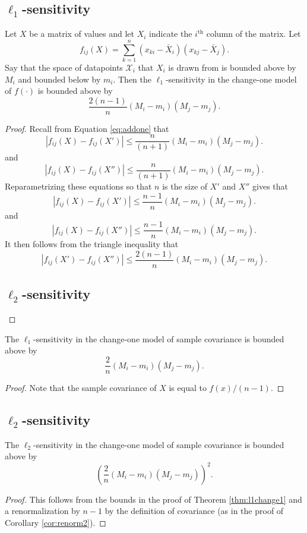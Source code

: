 \documentclass[11pt]{scrartcl} %
\begin{document}
\subsection{$\ell_1$-sensitivity}

\begin{theorem}
\label{thm:l1change1}
Let $X$ be a matrix of values and let $X_i$ indicate the $i^{\text{th}}$ column of the matrix. Let
$$ f_{ij} (X)= \sum_{k=1}^n (x_{ki} - \bar{X}_i)(x_{kj} - \bar{X}_j).$$
Say that the space of datapoints $\mathcal{X}_i$ that $X_i$ is drawn from is bounded above by $M_i$ and bounded below by $m_i$. Then the $\ell_1$-sensitivity in the change-one model of $f(\cdot)$ is bounded above by
$$ \frac{2(n-1)}{n}  (M_i - m_i)(M_j - m_j).$$
\end{theorem}

\begin{proof}
Recall from Equation \ref{eq:addone} that 
$$ \left\vert f_{ij}(X) - f_{ij}(X') \right\vert \le \frac{n}{(n+1)}  (M_i - m_i)(M_j - m_j).$$
and
$$ \left\vert f_{ij}(X) - f_{ij}(X'') \right\vert \le \frac{n}{(n+1)}  (M_i - m_i)(M_j - m_j).$$
Reparametrizing these equations so that $n$ is the size of $X'$ and $X''$ gives that 
$$ \left\vert f_{ij}(X) - f_{ij}(X') \right\vert \le \frac{n-1}{n}  (M_i - m_i)(M_j - m_j).$$
and
$$ \left\vert f_{ij}(X) - f_{ij}(X'') \right\vert \le \frac{n-1}{n}  (M_i - m_i)(M_j - m_j).$$
It then follows from the triangle inequality that 
$$ \left\vert f_{ij}(X') - f_{ij}(X'') \right\vert \le \frac{2(n-1)}{n}  (M_i - m_i)(M_j - m_j).$$
\subsection{$\ell_2$-sensitivity}
\end{proof}

\begin{corollary}
\label{cor:renorm2}
The $\ell_1$-sensitivity in the change-one model of sample covariance is bounded above by
$$\frac{2}{n}  (M_i - m_i)(M_j - m_j).$$
\end{corollary}

\begin{proof}
Note that the sample covariance of $X$ is equal to $f(x)/(n-1)$.
\end{proof}

\subsection{$\ell_2$-sensitivity}

\begin{theorem}
The $\ell_2$-sensitivity in the change-one model of sample covariance is bounded above by 
$$\left(\frac{2}{n}  (M_i - m_i)(M_j - m_j)\right)^2.$$
\end{theorem}

\begin{proof}
This follows from the bounds in the proof of Theorem \ref{thm:l1change1} and a renormalization by $n-1$ by the definition of covariance (as in the proof of Corollary \ref{cor:renorm2}).
\end{proof}



\end{document}
